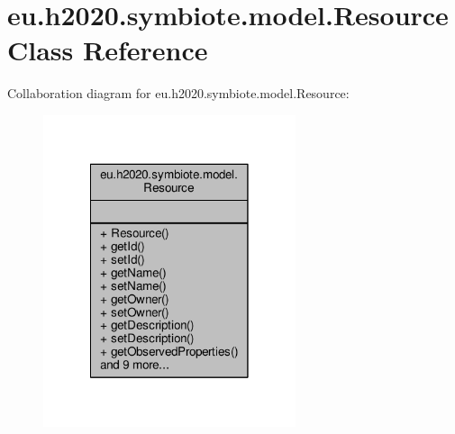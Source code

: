 \hypertarget{classeu_1_1h2020_1_1symbiote_1_1model_1_1Resource}{}\section{eu.\+h2020.\+symbiote.\+model.\+Resource Class Reference}
\label{classeu_1_1h2020_1_1symbiote_1_1model_1_1Resource}


Collaboration diagram for eu.\+h2020.\+symbiote.\+model.\+Resource\+:
\nopagebreak
\begin{figure}[H]
\begin{center}
\leavevmode
\includegraphics[width=210pt]{classeu_1_1h2020_1_1symbiote_1_1model_1_1Resource__coll__graph}
\end{center}
\end{figure}
